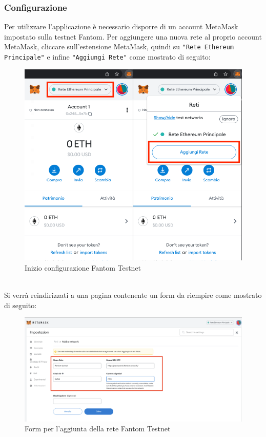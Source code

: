 \subsubsection{Configurazione}
Per utilizzare l'applicazione \projectName{} è necessario disporre di un account MetaMask impostato sulla testnet Fantom.
Per aggiungere una nuova rete al proprio account MetaMask, cliccare sull'estensione MetaMask, quindi su \texttt{"Rete Ethereum Principale"}  e infine \texttt{"Aggiungi Rete"} come mostrato di seguito:
\begin{figure}[H]
    \centering
    \includegraphics[scale=0.4]{immagini/Configuration.png}
    \caption{Inizio configurazione Fantom Testnet}
\end{figure}
\textbf{}\\
Si verrà reindirizzati a una pagina contenente un form da riempire come mostrato di seguito:
\begin{figure}[H]
    \centering
    \includegraphics[scale=0.3]{immagini/ConfData.png}
    \caption{Form per l'aggiunta della rete Fantom Testnet}
\end{figure} 
